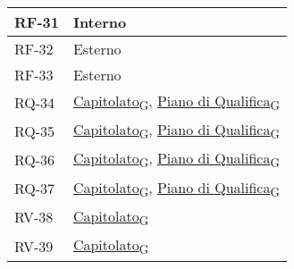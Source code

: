 \begin{longtable}{|>{\centering\arraybackslash}m{}|>{\centering\arraybackslash}m{}|}
	RF-31              & Interno                                                                                                                                                                                                                                              \\\hline
	RF-32              & Esterno                                                                                                                                                                                                                                              \\\hline
	RF-33              & Esterno                                                                                                                                                                                                                                              \\\hline
	RQ-34              & \href{https://7last.github.io/docs/rtb/documentazione-interna/glossario\#capitolato}{Capitolato\textsubscript{G}}, \href{https://7last.github.io/docs/rtb/documentazione-interna/glossario\#piano-di-qualifica}{Piano di Qualifica\textsubscript{G}} \\\hline
	RQ-35              & \href{https://7last.github.io/docs/rtb/documentazione-interna/glossario\#capitolato}{Capitolato\textsubscript{G}}, \href{https://7last.github.io/docs/rtb/documentazione-interna/glossario\#piano-di-qualifica}{Piano di Qualifica\textsubscript{G}} \\\hline
	RQ-36              & \href{https://7last.github.io/docs/rtb/documentazione-interna/glossario\#capitolato}{Capitolato\textsubscript{G}}, \href{https://7last.github.io/docs/rtb/documentazione-interna/glossario\#piano-di-qualifica}{Piano di Qualifica\textsubscript{G}} \\\hline
	RQ-37              & \href{https://7last.github.io/docs/rtb/documentazione-interna/glossario\#capitolato}{Capitolato\textsubscript{G}}, \href{https://7last.github.io/docs/rtb/documentazione-interna/glossario\#piano-di-qualifica}{Piano di Qualifica\textsubscript{G}} \\\hline
	RV-38              & \href{https://7last.github.io/docs/rtb/documentazione-interna/glossario\#capitolato}{Capitolato\textsubscript{G}}                                                                                                                                    \\\hline
	RV-39              & \href{https://7last.github.io/docs/rtb/documentazione-interna/glossario\#capitolato}{Capitolato\textsubscript{G}}                                                                                                                                    \\\hline

\end{longtable}
